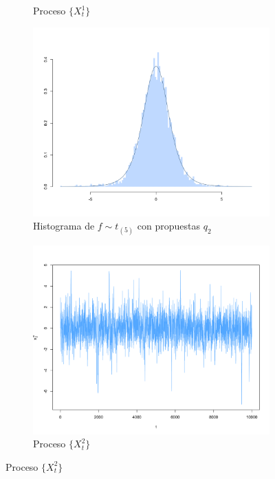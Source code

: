 \documentclass[11pt,a4paper]{article}
\begin{document}
\begin{figure}
\begin{subfigure}[t]{0.45\textwidth}
        \caption{Proceso $\lbrace X_t^1 \rbrace$} \label{fig:mh_chain_x1}
    \end{subfigure}

    \vspace{0.2cm}
    
    \begin{subfigure}[t]{0.45\textwidth}
        \centering
        \includegraphics[width=\linewidth]{mh_hist_x2.png} 
        \caption{Histograma de $f \sim t_{(5)}$ con propuestas $q_2$} \label{fig:mh_hist_x2}
    \end{subfigure}
    \hfill
    \begin{subfigure}[t]{0.45\textwidth}
        \centering
        \includegraphics[width=\linewidth]{mh_chain_x2.png} 
        \caption{Proceso $\lbrace X_t^2 \rbrace$} \label{fig:mh_chain_x2}
    \end{subfigure}
    

\end{figure}
\end{document}

